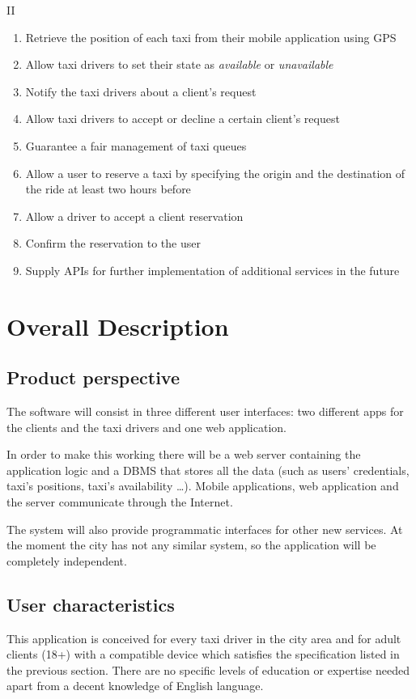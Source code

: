 \documentclass[9pt]{beamer}
\makeatletter
\newcommand*{\currentname}{\@currentlabelname}
\newcounter{saveenumi}
\newcommand{\conti}{\setcounter{enumi}{\value{saveenumi}}}
\makeatother
\begin{document}
\begin{frame}{\currentname{} II}
\begin{enumerate}[label=\bfseries G\arabic*:]
\conti
\item Retrieve the position of each taxi from their mobile application using GPS
\item Allow taxi drivers to set their state as \emph{available} or \emph{unavailable}
\item Notify the taxi drivers about a client's request
\item Allow taxi drivers to accept or decline a certain client's request
\item Guarantee a fair management of taxi queues
\item Allow a user to reserve a taxi by specifying the origin and the destination of the ride at least two hours before
\item Allow a driver to accept a client reservation
\item Confirm the reservation to the user
\item Supply APIs for further implementation of additional services in the future
\end{enumerate}
\end{frame}

\section{Overall Description}
\subsection{Product perspective}
\begin{frame}{\currentname}
The software will consist in three different user interfaces: two different apps for the clients and the taxi drivers and one web application. 

In order to make this working there will be a web server containing the application logic and a DBMS that stores all the data (such as users' credentials, taxi's positions, taxi's availability \ldots).
Mobile applications, web application and the server communicate through the Internet.

The system will also provide programmatic interfaces for other new services. At the moment the city has not any similar system, so the application will be completely independent.
\end{frame}

\subsection{User characteristics}
\begin{frame}{\currentname}
This application is conceived for every taxi driver in the city area and for adult clients (18+) with a compatible device which satisfies the specification listed in the previous section. There are no specific levels of education or expertise needed apart from a decent knowledge of English language.
\end{frame}
\end{document}
